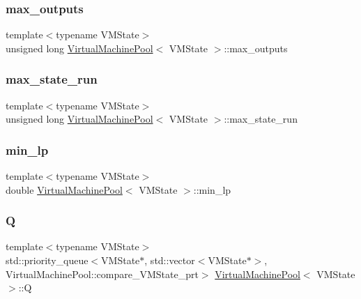 \subsubsection{\texorpdfstring{max\+\_\+outputs}{max\_outputs}}
{\footnotesize\ttfamily template$<$typename V\+M\+State$>$ \\
unsigned long \hyperlink{class_virtual_machine_pool}{Virtual\+Machine\+Pool}$<$ V\+M\+State $>$\+::max\+\_\+outputs}

\mbox{\label{class_virtual_machine_pool_ac64fb33b9ff42650839f8b10f2b11a4a}} 
\subsubsection{\texorpdfstring{max\+\_\+state\+\_\+run}{max\_state\_run}}
{\footnotesize\ttfamily template$<$typename V\+M\+State$>$ \\
unsigned long \hyperlink{class_virtual_machine_pool}{Virtual\+Machine\+Pool}$<$ V\+M\+State $>$\+::max\+\_\+state\+\_\+run}

\mbox{\label{class_virtual_machine_pool_adef21b421dc051008ba0bd4ee59a3809}} 
\subsubsection{\texorpdfstring{min\+\_\+lp}{min\_lp}}
{\footnotesize\ttfamily template$<$typename V\+M\+State$>$ \\
double \hyperlink{class_virtual_machine_pool}{Virtual\+Machine\+Pool}$<$ V\+M\+State $>$\+::min\+\_\+lp}

\mbox{\label{class_virtual_machine_pool_a6bb6ec72e4b6fb87bb3b7ea6eb0e4d6e}} 
\subsubsection{\texorpdfstring{Q}{Q}}
{\footnotesize\ttfamily template$<$typename V\+M\+State$>$ \\
std\+::priority\+\_\+queue$<$V\+M\+State$\ast$, std\+::vector$<$V\+M\+State$\ast$$>$, Virtual\+Machine\+Pool\+::compare\+\_\+\+V\+M\+State\+\_\+prt$>$ \hyperlink{class_virtual_machine_pool}{Virtual\+Machine\+Pool}$<$ V\+M\+State $>$\+::Q}


